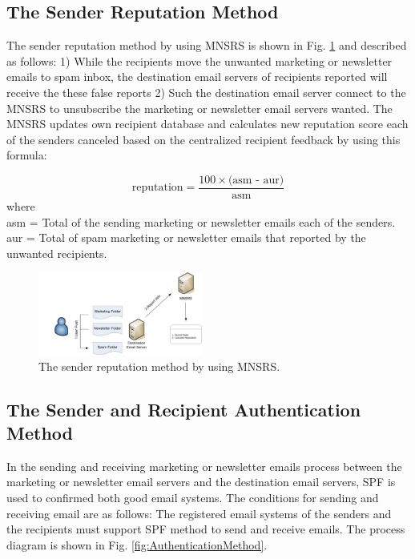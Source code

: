 \documentclass[conference]{IEEEtran}
\begin{document}
\subsection{The Sender Reputation Method}
The sender reputation method by using MNSRS is
shown in Fig. \ref{fig:ReputationMethod} and described as follows:
1) While the recipients move the unwanted marketing or newsletter emails to spam inbox, the destination email servers of recipients reported will receive the these false reports
2) Such the destination email server connect to the MNSRS to unsubscribe the marketing or newsletter email servers wanted.
The MNSRS updates own recipient database and calculates new reputation score each of the senders canceled based on the centralized recipient feedback by using this formula:

$$ \text{reputation} =  \frac{ 100\times{\text{(asm - aur)}}}{\text{asm}} $$
where\mbox{ }\\
asm = Total of the sending marketing or newsletter emails each of the senders.\\
aur = Total of spam  marketing or newsletter emails that reported by the unwanted recipients.


\begin{figure}
\centering
\includegraphics[width=0.48\textwidth]{6.pdf}
\caption{The sender reputation method by using MNSRS.}
\label{fig:ReputationMethod}
\end{figure}

\subsection{The Sender and Recipient Authentication Method}
In the sending and receiving marketing or newsletter emails process between the marketing or newsletter email servers and the destination email servers, SPF \cite{wong,NguyenTuanAnh,Seike} is used to confirmed both good email systems.
The conditions for sending and receiving email are as follows:
The registered email systems of the senders and the recipients must support SPF method to send and receive emails.
The process diagram is shown in Fig. \ref{fig:AuthenticationMethod}.
\end{document}
